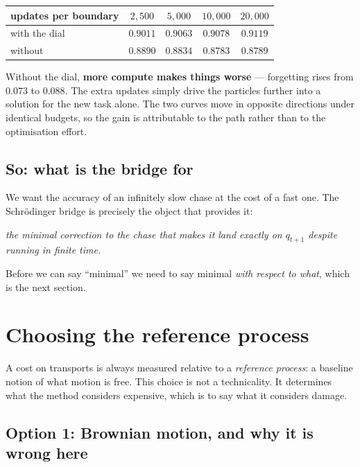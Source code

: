 \documentclass[11pt]{article}
\theoremstyle{definition}
\theoremstyle{plain}
\theoremstyle{remark}
\begin{document}
\begin{center}
\begin{tabular}{lcccc}
\toprule
updates per boundary & $2{,}500$ & $5{,}000$ & $10{,}000$ & $20{,}000$ \\
\midrule
with the dial & $0.9011$ & $0.9063$ & $0.9078$ & $\mathbf{0.9119}$ \\
without & $0.8890$ & $0.8834$ & $0.8783$ & $0.8789$ \\
\bottomrule
\end{tabular}
\end{center}

Without the dial, \textbf{more compute makes things worse} --- forgetting rises
from $0.073$ to $0.088$. The extra updates simply drive the particles further
into a solution for the new task alone. The two curves move in opposite
directions under identical budgets, so the gain is attributable to the path
rather than to the optimisation effort.

\subsection{So: what is the bridge for}

We want the accuracy of an infinitely slow chase at the cost of a fast one. The
Schr\"odinger bridge is precisely the object that provides it:

\begin{center}
\emph{the minimal correction to the chase that makes it land exactly on
$q_{t+1}$ despite running in finite time.}
\end{center}

Before we can say ``minimal'' we need to say minimal \emph{with respect to
what}, which is the next section.

\section{Choosing the reference process}
\label{sec:reference}

A cost on transports is always measured relative to a \emph{reference process}:
a baseline notion of what motion is free. This choice is not a technicality. It
determines what the method considers expensive, which is to say what it
considers damage.

\subsection{Option 1: Brownian motion, and why it is wrong here}
\end{document}
